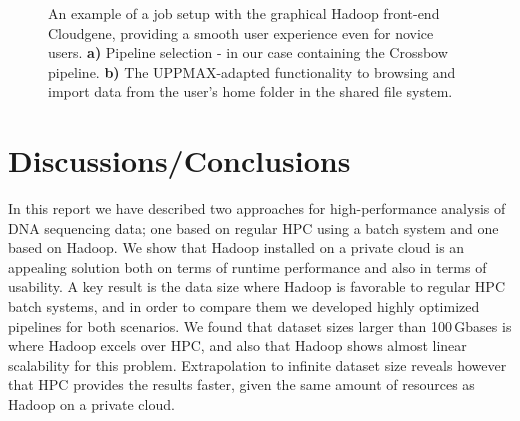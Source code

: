 \documentclass[11pt, oneside]{article}   	%
\newcommand{\COMMENT}[1]{{\color{red} #1 }}
\begin{document}
\begin{figure}
\begin{subfigure}[b]{0.6\textwidth}
		\subcaption{}
	\end{subfigure}
	\caption{An example of a job setup with the graphical Hadoop front-end Cloudgene, providing a smooth user experience even for novice users. \textbf{a)} Pipeline selection - in our case containing the Crossbow pipeline. \textbf{b)} The UPPMAX-adapted functionality to browsing and import data from the user's home folder in the shared file system.}
	\label{fig:fig4}
\end{figure}

\section{Discussions/Conclusions}
\label{sectionV}

In this report we have described two approaches for high-performance analysis of DNA sequencing data; one based on regular HPC using a batch system and one based on Hadoop. We show that Hadoop installed on a private cloud is an appealing solution both on terms of runtime performance and also in terms of usability. A key result is the data size where Hadoop is favorable to regular HPC batch systems, and in order to compare them we developed highly optimized pipelines for both scenarios. We found that dataset sizes larger than 100\,Gbases is where Hadoop excels over HPC, and also that Hadoop shows almost linear scalability for this problem. Extrapolation to infinite dataset size reveals however that HPC provides the results faster, given the same amount of resources as Hadoop on a private cloud.


\end{document}
